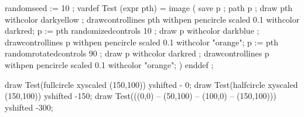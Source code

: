 
\continuewhenlmtxmode

\startMPpage[offset=1dk]
    randomseed := 10 ;
    vardef Test (expr pth) =
        image (
            save p ; path p ;
            draw pth withcolor darkyellow ;
            drawcontrollines pth withpen pencircle scaled 0.1 withcolor darkred;
            p := pth randomizedcontrols 10 ;
            draw p withcolor darkblue ;
            drawcontrollines p withpen pencircle scaled 0.1 withcolor "orange";
            p := pth randomrotatedcontrols 90 ;
            draw p withcolor darkred ;
            drawcontrollines p withpen pencircle scaled 0.1 withcolor "orange";
        )
    enddef ;

    draw Test(fullcircle xyscaled (150,100))               yshifted -  0;
    draw Test(halfcircle xyscaled (150,100))               yshifted -150;
    draw Test(((0,0) -- (50,100) -- (100,0) -- (150,100))) yshifted -300;
\stopMPpage
